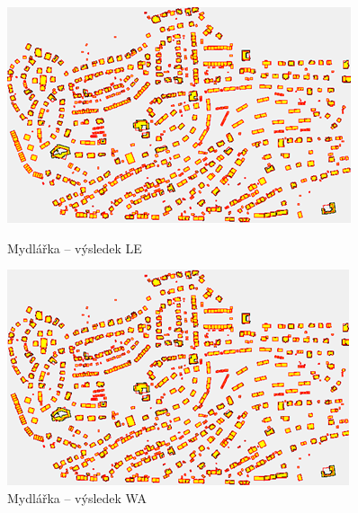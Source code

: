 \documentclass{article}
\begin{document}
\begin{spacing}{1.5}
\begin{figure}[htbp]
  \centering
  \begin{minipage}[b]{0.47\textwidth}
    \includegraphics[width=\textwidth]{images/Mydl_le.png}
    \caption{Mydlářka – výsledek LE}
  \end{minipage}
  \hfill
  \begin{minipage}[b]{0.47\textwidth}
    \includegraphics[width=\textwidth]{images/Mydl_wa.png}
    \caption{Mydlářka – výsledek WA}
  \end{minipage}
\end{figure}


\end{spacing}
\end{document}
